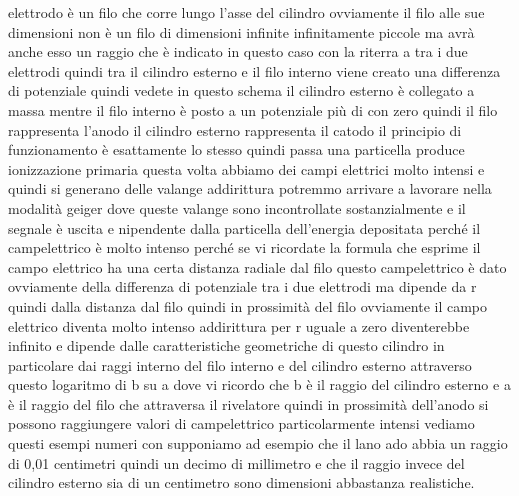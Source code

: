 elettrodo è un filo che corre lungo l'asse del cilindro ovviamente il filo alle sue dimensioni non è un filo di dimensioni infinite infinitamente piccole ma avrà anche esso un raggio che è indicato in questo caso con la riterra a tra i due elettrodi quindi tra il cilindro esterno e il filo interno viene creato una differenza di potenziale quindi vedete in questo schema il cilindro esterno è collegato a massa mentre il filo interno è posto a un potenziale più di con zero quindi il filo rappresenta l'anodo il cilindro esterno rappresenta il catodo il principio di funzionamento è esattamente lo stesso quindi passa una particella produce ionizzazione primaria questa volta abbiamo dei campi elettrici molto intensi e quindi si generano delle valange addirittura potremmo arrivare a lavorare nella modalità geiger dove queste valange sono incontrollate sostanzialmente e il segnale è uscita e nipendente dalla particella dell'energia depositata perché il campelettrico è molto intenso perché se vi ricordate la formula che esprime il campo elettrico ha una certa distanza radiale dal filo questo campelettrico è dato ovviamente della differenza di potenziale tra i due elettrodi ma dipende da r quindi dalla distanza dal filo quindi in prossimità del filo ovviamente il campo elettrico diventa molto intenso addirittura per r uguale a zero diventerebbe infinito e dipende dalle caratteristiche geometriche di questo cilindro in particolare dai raggi interno del filo interno e del cilindro esterno attraverso questo logaritmo di b su a dove vi ricordo che b è il raggio del cilindro esterno e a è il raggio del filo che attraversa il rivelatore quindi in prossimità dell'anodo si possono raggiungere valori di campelettrico particolarmente intensi vediamo questi esempi numeri con supponiamo ad esempio che il lano ado abbia un raggio di 0,01 centimetri quindi un decimo di millimetro e che il raggio invece del cilindro esterno sia di un centimetro sono dimensioni abbastanza realistiche. 

